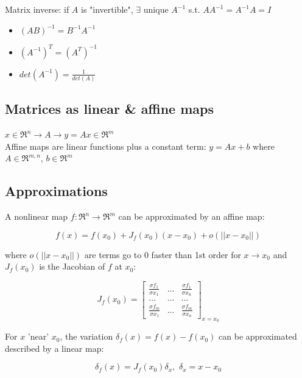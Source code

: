 Matrix inverse: if $A$ is "invertible", $\exists$ unique $A^{-1}$ s.t. $AA^{-1} = A^{-1}A = I$

\begin{itemize}
	\item $(AB)^{-1} = B^{-1}A^{-1}$
	
	\item $(A^{-1})^T = (A^T)^{-1}$
	
	\item $det(A^{-1}) = \frac{1}{det(A)}$
\end{itemize}

\subsection{Matrices as linear \& affine maps}


$x\in \Re^n \rightarrow A \rightarrow y = Ax \in \Re^m$\\

Affine maps are linear functions plus a constant term: $y = Ax + b$ where $A\in \Re^{m,n}$, $b\in \Re^m$

\subsection{Approximations}

A nonlinear map $f: \Re^n \rightarrow \Re^m$ can be approximated by an affine map:

\begin{equation*}
f(x) = f(x_0) + J_f(x_0)(x - x_0) + o(||x - x_0||)
\end{equation*}

where $o(||x - x_0||)$ are terms go to 0 faster than 1st order for $x\rightarrow x_0$ and $J_f(x_0)$ is the Jacobian of $f$ at $x_0$:




$$J_f(x_0) = 
\left[
\begin{matrix}
\frac{\sigma f_1}{\sigma x_1} &  ... & \frac{\sigma f_1}{\sigma x_n} \\
... &  ... & ...\\
\frac{\sigma f_m}{\sigma x_1} &  ... &\frac{\sigma f_m}{\sigma x_n}
\end{matrix}
\right]_{x = x_0}
$$

For $x$ 'near' $x_0$, the variation $\delta_f(x) =f(x) - f(x_0)$ can be approximated described by a linear map:

\begin{equation*}
\delta_f(x) = J_f(x_0)\delta_x, \,\, \delta_x = x - x_0
\end{equation*}
